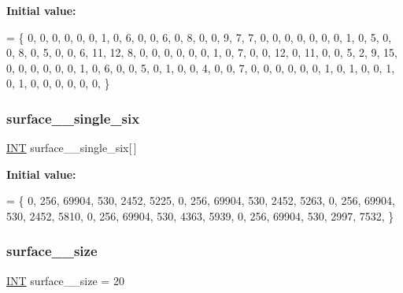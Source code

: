 {\bfseries Initial value\+:}
\begin{DoxyCode}
= \{
    0, 0, 0, 0, 0, 0, 1, 0, 6, 0, 0, 6, 0, 8, 0, 0, 9, 7, 7, 0, 
    0, 0, 0, 0, 0, 0, 1, 0, 5, 0, 0, 8, 0, 5, 0, 0, 6, 11, 12, 8, 
    0, 0, 0, 0, 0, 0, 1, 0, 7, 0, 0, 12, 0, 11, 0, 0, 5, 2, 9, 15, 
    0, 0, 0, 0, 0, 0, 1, 0, 6, 0, 0, 5, 0, 1, 0, 0, 4, 0, 0, 7, 
    0, 0, 0, 0, 0, 0, 1, 0, 1, 0, 0, 1, 0, 1, 0, 0, 0, 0, 0, 0, 
\}
\end{DoxyCode}
\mbox{\label{surface__16_8_c_a9639a210426db81ee6d54a8170d82b57}} 
\subsubsection{\texorpdfstring{surface\+\_\+\_\+single\+\_\+six}{surface\_16\_single\_six}}
{\footnotesize\ttfamily \mbox{\hyperlink{galois_8h_a09fddde158a3a20bd2dcadb609de11dc}{I\+NT}} surface\+\_\+\_\+single\+\_\+six\mbox{[}$\,$\mbox{]}}

{\bfseries Initial value\+:}
\begin{DoxyCode}
= \{ 
    0, 256, 69904, 530, 2452, 5225, 
    0, 256, 69904, 530, 2452, 5263, 
    0, 256, 69904, 530, 2452, 5810, 
    0, 256, 69904, 530, 4363, 5939, 
    0, 256, 69904, 530, 2997, 7532, 
\}
\end{DoxyCode}
\mbox{\label{surface__16_8_c_aff01077f4ac65cc65e7494050df52106}} 
\subsubsection{\texorpdfstring{surface\+\_\+\_\+size}{surface\_16\_size}}
{\footnotesize\ttfamily \mbox{\hyperlink{galois_8h_a09fddde158a3a20bd2dcadb609de11dc}{I\+NT}} surface\+\_\+\_\+size = 20}

\mbox{\label{surface__16_8_c_ae4b46e8e2cfc1273ec178287d10765c2}} 
